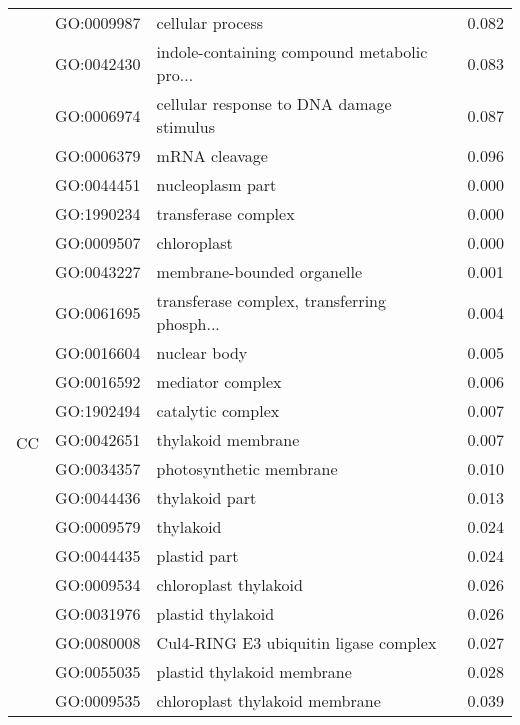 \begin{longtable}{lllr}
   & GO:0009987 &                             cellular process &         0.082 \\
   & GO:0042430 &  indole-containing compound metabolic pro... &         0.083 \\
   & GO:0006974 &     cellular response to DNA damage stimulus &         0.087 \\
   & GO:0006379 &                                mRNA cleavage &         0.096 \\
\cline{1-4}
\multirow{21}{*}{CC} & GO:0044451 &                             nucleoplasm part &         0.000 \\
   & GO:1990234 &                          transferase complex &         0.000 \\
   & GO:0009507 &                                  chloroplast &         0.000 \\
   & GO:0043227 &                   membrane-bounded organelle &         0.001 \\
   & GO:0061695 &  transferase complex, transferring phosph... &         0.004 \\
   & GO:0016604 &                                 nuclear body &         0.005 \\
   & GO:0016592 &                             mediator complex &         0.006 \\
   & GO:1902494 &                            catalytic complex &         0.007 \\
   & GO:0042651 &                           thylakoid membrane &         0.007 \\
   & GO:0034357 &                      photosynthetic membrane &         0.010 \\
   & GO:0044436 &                               thylakoid part &         0.013 \\
   & GO:0009579 &                                    thylakoid &         0.024 \\
   & GO:0044435 &                                 plastid part &         0.024 \\
   & GO:0009534 &                        chloroplast thylakoid &         0.026 \\
   & GO:0031976 &                            plastid thylakoid &         0.026 \\
   & GO:0080008 &        Cul4-RING E3 ubiquitin ligase complex &         0.027 \\
   & GO:0055035 &                   plastid thylakoid membrane &         0.028 \\
   & GO:0009535 &               chloroplast thylakoid membrane &         0.039 \\

\end{longtable}
